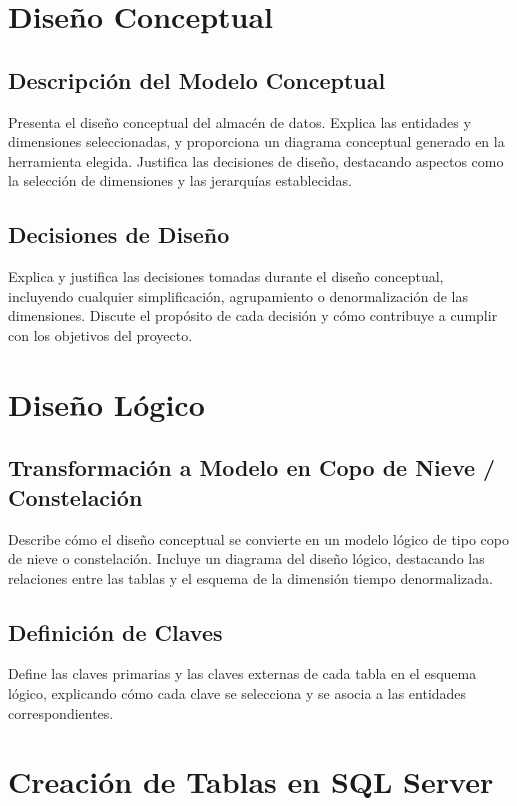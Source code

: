 \documentclass{article}
\begin{document}
\section{Diseño Conceptual}
\label{sec:diseno_conceptual}
\subsection{Descripción del Modelo Conceptual}
Presenta el diseño conceptual del almacén de datos. Explica las entidades y dimensiones seleccionadas, y proporciona un diagrama conceptual generado en la herramienta elegida. Justifica las decisiones de diseño, destacando aspectos como la selección de dimensiones y las jerarquías establecidas.

\subsection{Decisiones de Diseño}
Explica y justifica las decisiones tomadas durante el diseño conceptual, incluyendo cualquier simplificación, agrupamiento o denormalización de las dimensiones. Discute el propósito de cada decisión y cómo contribuye a cumplir con los objetivos del proyecto.

\section{Diseño Lógico}
\label{sec:diseno_logico}
\subsection{Transformación a Modelo en Copo de Nieve / Constelación}
Describe cómo el diseño conceptual se convierte en un modelo lógico de tipo copo de nieve o constelación. Incluye un diagrama del diseño lógico, destacando las relaciones entre las tablas y el esquema de la dimensión tiempo denormalizada.

\subsection{Definición de Claves}
Define las claves primarias y las claves externas de cada tabla en el esquema lógico, explicando cómo cada clave se selecciona y se asocia a las entidades correspondientes.

\section{Creación de Tablas en SQL Server}
\label{sec:creacion_tablas}
\end{document}
